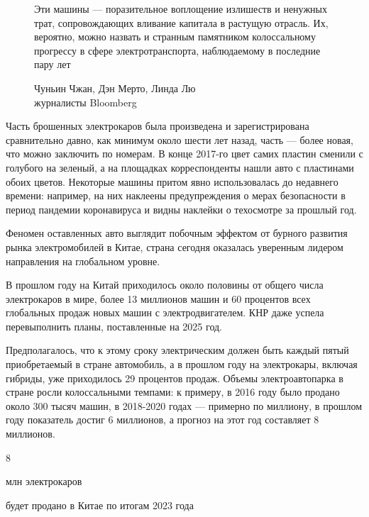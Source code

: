 \begin{figure}
    \begin{fancyquotes}
        Эти машины — поразительное воплощение излишеств и ненужных трат, сопровождающих вливание капитала в растущую отрасль. Их, вероятно, можно назвать и странным памятником колоссальному прогрессу в сфере электротранспорта, наблюдаемому в последние пару лет\\

        \begin{flushright}
            Чуньин Чжан, Дэн Мерто, Линда Лю\\
            журналисты Bloomberg
        \end{flushright}
    \end{fancyquotes}
\end{figure}
Часть брошенных электрокаров была произведена и зарегистрирована сравнительно давно, как минимум около шести лет назад, часть — более новая, что можно заключить по номерам. В конце 2017-го цвет самих пластин сменили с голубого на зеленый, а на площадках корреспонденты нашли авто с пластинами обоих цветов. Некоторые машины притом явно использовалась до недавнего времени: например, на них наклеены предупреждения о мерах безопасности в период пандемии коронавируса и видны наклейки о техосмотре за прошлый год.

Феномен оставленных авто выглядит побочным эффектом от бурного развития рынка электромобилей в Китае, страна сегодня оказалась уверенным лидером направления на глобальном уровне.


В прошлом году на Китай приходилось около половины от общего числа электрокаров в мире, более 13 миллионов машин и 60 процентов всех глобальных продаж новых машин с электродвигателем. КНР даже успела перевыполнить планы, поставленные на 2025 год.

Предполагалось, что к этому сроку электрическим должен быть каждый пятый приобретаемый в стране автомобиль, а в прошлом году на электрокары, включая гибриды, уже приходилось 29 процентов продаж. Объемы электроавтопарка в стране росли колоссальными темпами: к примеру, в 2016 году было продано около 300 тысяч машин, в 2018-2020 годах — примерно по миллиону, в прошлом году показатель достиг 6 миллионов, а прогноз на этот год составляет 8 миллионов.

\vspace*{1em}
\begin{center}
    {\Huge 8}

    {\Large млн электрокаров}

    будет продано в Китае по итогам 2023 года
\end{center}
\vspace*{1em}

